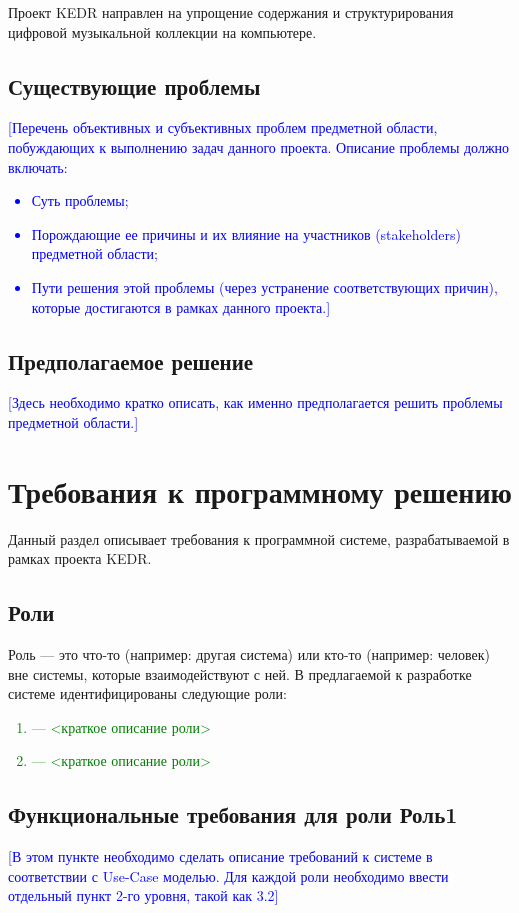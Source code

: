 \documentclass[pdftex,12pt,a4paper]{report}
\providecommand{\comment}[1]{\textcolor{blue}{#1}}
\providecommand{\replace}[1]{\textcolor{green}{#1}}
\begin{document}
Проект KEDR направлен на упрощение содержания и структурирования цифровой музыкальной коллекции на компьютере.

\subsection{Существующие проблемы}
\comment{[Перечень объективных и субъективных проблем предметной области, побуждающих к выполнению задач данного проекта. Описание проблемы должно включать: 
	\begin{itemize}
		\item Суть проблемы;
		\item Порождающие ее причины и их влияние на участников (stakeholders)  предметной области; 
		\item Пути решения этой проблемы (через устранение соответствующих причин), которые достигаются в рамках данного проекта.]
	\end{itemize}}

\subsection{Предполагаемое решение}
\comment{[Здесь необходимо кратко описать, как именно предполагается решить проблемы предметной области.]}

\section{Требования к программному решению}
Данный раздел описывает требования к программной системе, разрабатываемой в рамках проекта KEDR.

\subsection{Роли}
Роль --- это что-то (например: другая система) или кто-то (например: человек) вне системы, которые взаимодействуют с ней. В предлагаемой к разработке системе идентифицированы следующие роли:
\replace{
	\begin{enumerate}
		\item <Роль1> --– <краткое описание роли>
		\item <Роль2> –-- <краткое описание роли>
	\end{enumerate}
}

\subsection{Функциональные требования для роли Роль1}
\comment{[В этом пункте необходимо сделать описание требований к системе в соответствии с Use-Case моделью. Для каждой роли необходимо ввести отдельный пункт 2-го уровня, такой как 3.2]}
\end{document}
